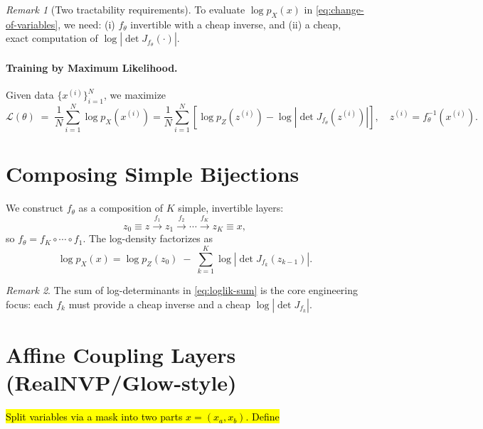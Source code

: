 \documentclass[11pt]{article}
\theoremstyle{remark}
\newtheorem*{remark}{Remark}
\begin{document}
\begin{remark}[Two tractability requirements]
To evaluate $\log p_X(x)$ in \eqref{eq:change-of-variables}, we need: (i) $f_\theta$ invertible with a cheap inverse, and (ii) a cheap, exact computation of $\log \left|\det J_{f_\theta}(\cdot)\right|$.
\end{remark}

\paragraph{Training by Maximum Likelihood.}
Given data $\{x^{(i)}\}_{i=1}^N$, we maximize
\begin{equation}
\mathcal{L}(\theta) \;=\; \frac{1}{N}\sum_{i=1}^N \log p_X\!\left(x^{(i)}\right)
= \frac{1}{N}\sum_{i=1}^N \left[ \log p_Z\!\left(z^{(i)}\right) - \log\left|\det J_{f_\theta}\!\left(z^{(i)}\right)\right| \right],
\quad z^{(i)}=f_\theta^{-1}\!\left(x^{(i)}\right).
\label{eq:mle}
\end{equation}

\section{Composing Simple Bijections}
We construct $f_\theta$ as a composition of $K$ simple, invertible layers:
\begin{equation}
z_0 \equiv z \xrightarrow{f_1} z_1 \xrightarrow{f_2} \cdots \xrightarrow{f_K} z_K \equiv x,
\label{eq:composition}
\end{equation}
so $f_\theta = f_K\circ\cdots\circ f_1$. The log-density factorizes as
\begin{equation}
\log p_X(x) = \log p_Z(z_0)\;-\; \sum_{k=1}^{K} \log\left|\det J_{f_k}(z_{k-1})\right|.
\label{eq:loglik-sum}
\end{equation}
\begin{remark}
The sum of log-determinants in \eqref{eq:loglik-sum} is the core engineering focus: each $f_k$ must provide a cheap inverse and a cheap $\log|\det J_{f_k}|$.
\end{remark}

\section{Affine Coupling Layers (RealNVP/Glow-style)}

\hl{Split variables via a mask into two parts $x=(x_a,x_b)$. Define}
\end{document}
